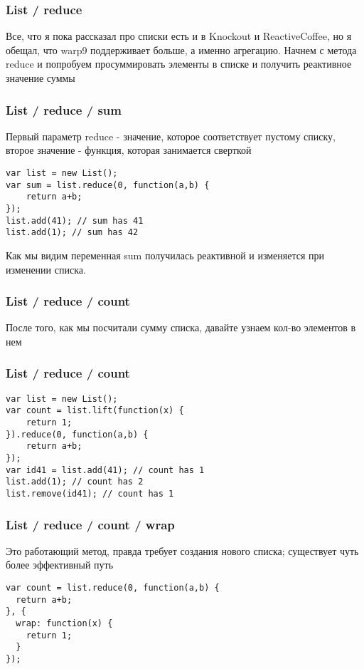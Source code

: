 \documentclass[xetex]{beamer}
\begin{document}
\begin{frame}[fragile]
\frametitle{List / reduce}
Все, что я пока рассказал про списки есть и в Knockout и ReactiveCoffee, но я обещал, что warp9 поддерживает больше, а именно агрегацию. Начнем с метода reduce и попробуем просуммировать элементы в списке и получить реактивное значение суммы
\end{frame}


\lstset{
  xleftmargin=.05\textwidth, xrightmargin=.05\textwidth
}


\begin{frame}[fragile]
\frametitle{List / reduce / sum}
Первый параметр reduce - значение, которое соответствует пустому списку, второе значение - функция, которая занимается сверткой
\vspace{4mm}
\begin{lstlisting}
var list = new List();
var sum = list.reduce(0, function(a,b) { 
    return a+b; 
});
list.add(41); // sum has 41
list.add(1); // sum has 42
\end{lstlisting}
\vspace{4mm}
Как мы видим переменная sum получилась реактивной и изменяется при изменении списка. 
\end{frame}


\begin{frame}[fragile]
\frametitle{List / reduce / count}
После того, как мы посчитали сумму списка, давайте узнаем кол-во элементов в нем
\end{frame}


\begin{frame}[fragile]
\frametitle{List / reduce / count}
\begin{lstlisting}
var list = new List();
var count = list.lift(function(x) { 
    return 1; 
}).reduce(0, function(a,b) { 
    return a+b; 
});
var id41 = list.add(41); // count has 1
list.add(1); // count has 2
list.remove(id41); // count has 1
\end{lstlisting}
\end{frame}


\begin{frame}[fragile]
\frametitle{List / reduce / count / wrap}
Это работающий метод, правда требует создания нового списка; существует чуть более эффективный путь
\vspace{10mm}
\begin{lstlisting}
var count = list.reduce(0, function(a,b) { 
  return a+b; 
}, {
  wrap: function(x) { 
    return 1; 
  } 
});
\end{lstlisting}
\end{frame}
\end{document}

